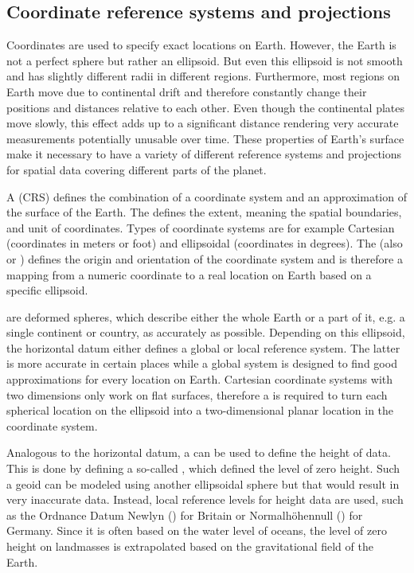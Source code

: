 	\subsection{Coordinate reference systems and projections}
	
		Coordinates are used to specify exact locations on Earth.
		However, the Earth is not a perfect sphere but rather an ellipsoid.
		But even this ellipsoid is not smooth and has slightly different radii in different regions.
		Furthermore, most regions on Earth move due to continental drift and therefore constantly change their positions and distances relative to each other.
		Even though the continental plates move slowly, this effect adds up to a significant distance rendering very accurate measurements potentially unusable over time\cite[7]{ordenance-survey-booklet}.
		These properties of Earth's surface make it necessary to have a variety of different reference systems and projections for spatial data covering different parts of the planet.
		
		A  (CRS) defines the combination of a coordinate system and an approximation of the surface of the Earth.
		The  defines the extent, meaning the spatial boundaries, and unit of coordinates.
		Types of coordinate systems are for example Cartesian (coordinates in meters or foot) and ellipsoidal (coordinates in degrees)\cite[11-13]{ordenance-survey-booklet}.
		The  (also  or ) defines the origin and orientation of the coordinate system and is therefore a mapping from a numeric coordinate to a real location on Earth based on a specific ellipsoid.
		
		 are deformed spheres, which describe either the whole Earth or a part of it, e.g. a single continent or country, as accurately as possible.
		Depending on this ellipsoid, the horizontal datum either defines a global or local reference system.
		The latter is more accurate in certain places while a global system is designed to find good approximations for every location on Earth.
		Cartesian coordinate systems with two dimensions only work on flat surfaces, therefore a  is required to turn each spherical location on the ellipsoid into a two-dimensional planar location in the coordinate system\cite[17]{ordenance-survey-booklet}.
		
		Analogous to the horizontal datum, a  can be used to define the height of data\cite{ordenance-survey-booklet}.
		This is done by defining a so-called , which defined the level of zero height.
		Such a geoid can be modeled using another ellipsoidal sphere but that would result in very inaccurate data.
		Instead, local reference levels for height data are used, such as the Ordnance Datum Newlyn () for Britain or Normalhöhennull () for Germany.
		Since it is often based on the water level of oceans, the level of zero height on landmasses is extrapolated based on the gravitational field of the Earth.
		
